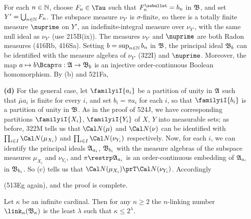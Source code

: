 {For each $n\in\Bbb N$, choose $F_n\in\Tau$ such that $F_n^{\ssbullet}=b_n$
in $\frak B$, and set $Y'=\bigcup_{n\in\Bbb N}F_n$.   The subspace measure
$\nu_{Y'}$ is $\sigma$-finite, so there is a totally finite measure
$\nuprime$ on $Y'$, an indefinite-integral measure over $\nu_{Y'}$,
with the same null ideal as $\nu_{Y'}$ (use 215B(ix)).
The measures $\nu_{Y'}$ and $\nuprime$ are
both Radon measures (416Rb, 416Sa).   Setting $b=\sup_{n\in\Bbb N}b_n$ in
$\frak B$, the principal ideal $\frak B_b$ can be identified with the
measure algebra of $\nu_{Y'}$ (322I) and $\nuprime$.   Moreover, the map
$a\mapsto b\Bcap\pi a:\frak A\to\frak B_b$ is an injective order-continuous
Boolean homomorphism.   By (b) and 521Fa,


\medskip

{\bf (d)} For the general case, let $\familyiI{a_i}$ be a partition of
unity in $\frak A$ such that $\bar\mu a_i$ is finite for every $i$, and
set $b_i=\pi a_i$ for each $i$, so that $\familyiI{b_i}$ is a partition of
unity in $\frak B$.   As in the proof of 524J, we have corresponding
partitions $\familyiI{X_i}$, $\familyiI{Y_i}$ of $X$, $Y$ into measurable
sets;  as before, 322M tells us that $\Cal N(\mu)$ and $\Cal N(\nu)$ can be
identified with $\prod_{i\in I}\Cal N(\mu_{X_i})$ and
$\prod_{i\in I}\Cal N(\nu_{Y_i})$ respectively.
Now, for each $i$, we can identify the principal ideals
$\frak A_{a_i}$, $\frak B_{b_i}$ with the measure algebras of the subspace
measures $\mu_{X_i}$ and $\nu_{Y_i}$, and $\pi\restrp\frak A_{a_i}$ is an
order-continuous embedding of $\frak A_{a_i}$ in $\frak B_{b_i}$.   So (c)
tells us that $\Cal N(\mu_{X_i})\prT\Cal N(\nu_{Y_i})$.   Accordingly


\noindent (513Eg again), and the proof is complete.
}%

 Let
$\kappa$ be an infinite cardinal.   Then for any $n\ge 2$ the
$n$-linking number $\link_n(\frak B_{\kappa})$ is the least $\lambda$
such that $\kappa\le 2^{\lambda}$.

